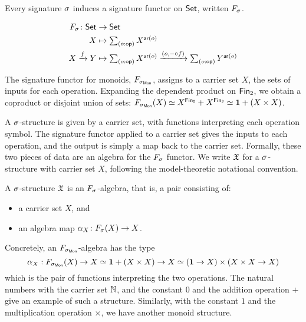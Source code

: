 Every signature $\sigma$ induces a signature functor on $\mathsf{Set}$, written $\Sig$.

\begin{definition}
    \label{def:signature-functor}
    \begin{align*}
        \Sig \colon \Set & \to \Set                         \\
        X                & \mapsto \dsum{o:\op}{X^{\ar(o)}} \\
        X \xto{f} Y      & \mapsto
        \dsum{o:\op}{X^{\ar(o)}}
        \xto{(o, \blank \comp f)}
        \dsum{o:\op}{Y^{\ar(o)}}
    \end{align*}
\end{definition}

\begin{example}
    The signature functor for monoids, $\SigMon$, assigns to a carrier set $X$,
    the sets of inputs for each operation.
    Expanding the dependent product on $\Fin[2]$, we obtain a coproduct or disjoint union of sets:
    $\SigMon(X) \eqv X^{\Fin[0]} + X^{\Fin[2]} \eqv \unitt + (X \times X)$.
\end{example}

A $\sigma$-structure is given by a carrier set, with functions interpreting each operation symbol.
%
The signature functor applied to a carrier set gives the inputs to each operation, and the output is simply a map back
to the carrier set.
%
Formally, these two pieces of data are an algebra for the $\Sig$ functor.
%
We write $\mathfrak{X}$ for a $\sigma$-structure with carrier set $X$, following the model-theoretic notational convention.

\begin{definition}[Structure]\label{algebra:struct}
    A $\sigma$-structure $\mathfrak{X}$ is an $\Sig$-algebra, that is, a pair consisting of:
    \begin{itemize}
        \item a carrier set $X$, and
        \item an algebra map $\alpha_{X}\colon \Sig(X) \to X$.
    \end{itemize}
\end{definition}

\begin{example}
    Concretely, an $\SigMon$-algebra has the type
    \[
        \alpha_{X} : \SigMon(X) \to X \eqv \unitt + (X \times X) \to X \eqv (\unitt \to X) \times (X \times X \to X)
    \]
    which is the pair of functions interpreting the two operations.
    The natural numbers with the carrier set $\mathbb{N}$,
    and the constant $0$ and the addition operation $+$ give an example of such a structure.
    Similarly, with the constant $1$ and the multiplication operation $\times$, we have another monoid structure.
\end{example}

